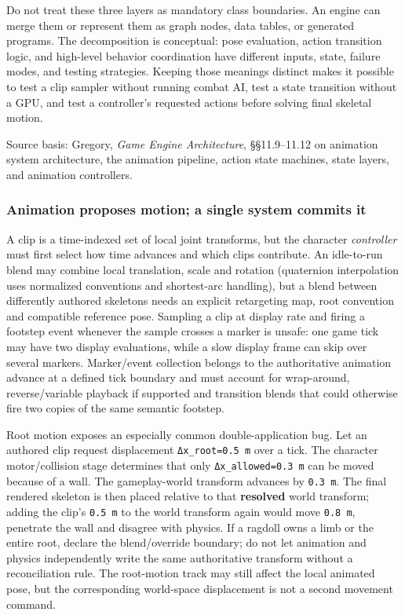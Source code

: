 Do not treat these three layers as mandatory class boundaries. An engine can merge them or represent them as graph nodes, data tables, or generated programs. The decomposition is conceptual: pose evaluation, action transition logic, and high-level behavior coordination have different inputs, state, failure modes, and testing strategies. Keeping those meanings distinct makes it possible to test a clip sampler without running combat AI, test a state transition without a GPU, and test a controller's requested actions before solving final skeletal motion.

Source basis: Gregory, \emph{Game Engine Architecture}, §§11.9--11.12 on animation system architecture, the animation pipeline, action state machines, state layers, and animation controllers.

\subsubsection{Animation proposes motion; a single system commits it}\label{06-engine-ii-ch040-animation-proposes-motion-a-single-system-commits-it}

\hypertarget{06-engine-ii-ch040-animation-proposes-motion-a-single-system-commits-it}{}

A clip is a time-indexed set of local joint transforms, but the character \emph{controller} must first select how time advances and which clips contribute. An idle-to-run blend may combine local translation, scale and rotation (quaternion interpolation uses normalized conventions and shortest-arc handling), but a blend between differently authored skeletons needs an explicit retargeting map, root convention and compatible reference pose. Sampling a clip at display rate and firing a footstep event whenever the sample crosses a marker is unsafe: one game tick may have two display evaluations, while a slow display frame can skip over several markers. Marker/event collection belongs to the authoritative animation advance at a defined tick boundary and must account for wrap-around, reverse/variable playback if supported and transition blends that could otherwise fire two copies of the same semantic footstep.

Root motion exposes an especially common double-application bug. Let an authored clip request displacement \texttt{Δx\_root=0.5\ m} over a tick. The character motor/collision stage determines that only \texttt{Δx\_allowed=0.3\ m} can be moved because of a wall. The gameplay-world transform advances by \texttt{0.3\ m}. The final rendered skeleton is then placed relative to that \textbf{resolved} world transform; adding the clip's \texttt{0.5\ m} to the world transform again would move \texttt{0.8\ m}, penetrate the wall and disagree with physics. If a ragdoll owns a limb or the entire root, declare the blend/override boundary; do not let animation and physics independently write the same authoritative transform without a reconciliation rule. The root-motion track may still affect the local animated pose, but the corresponding world-space displacement is not a second movement command.

